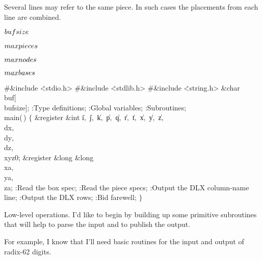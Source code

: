 Several lines may refer to the same piece. In such cases the placements
from each line are combined.

\Y\B\4\D$\\{bufsize}$ \5
\par
\B\4\D$\\{maxpieces}$ \5
\par
\B\4\D$\\{maxnodes}$ \5
\par
\B\4\D$\\{maxbases}$ \5
\par
\Y\B\8\#\&{include} \.{<stdio.h>}\6
\8\#\&{include} \.{<stdlib.h>}\6
\8\#\&{include} \.{<string.h>}\6
\&{char} \\{buf}[\\{bufsize}];\7
:Type definitions\X;\6
:Global variables\X;\6
:Subroutines\X;\7
\\{main}(\,)\1\1\2\2\6
${}\{{}$\1\6
\&{register} \&{int} \|i${},{}$ \|j${},{}$ \|k${},{}$ \|p${},{}$ \|q${},{}$ %
\|r${},{}$ \|t${},{}$ \|x${},{}$ \|y${},{}$ \|z${},{}$ \\{dx}${},{}$ %
\\{dy}${},{}$ \\{dz}${},{}$ \\{xyz0};\6
\&{register} \&{long} \&{long} \\{xa}${},{}$ \\{ya}${},{}$ \\{za};\7
:Read the box spec\X;\6
:Read the piece specs\X;\6
:Output the {\mc DLX} column-name line\X;\6
:Output the {\mc DLX} rows\X;\6
:Bid farewell\X;\6
\4${}\}{}$\2\par
\fi

Low-level operations.
I'd like to begin by building up some primitive subroutines that will help
to parse the input and to publish the output.

For example, I know that
I'll need basic routines for the input and output of radix-62 digits.

